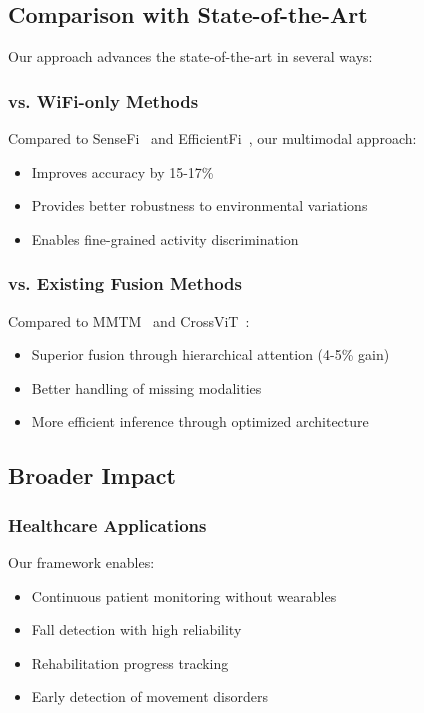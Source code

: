 \documentclass[journal]{IEEEtran}
\begin{document}
\subsection{Comparison with State-of-the-Art}

Our approach advances the state-of-the-art in several ways:

\subsubsection{vs. WiFi-only Methods}

Compared to SenseFi~\cite{sensefi2023} and EfficientFi~\cite{efficientfi2022}, our multimodal approach:
\begin{itemize}
\item Improves accuracy by 15-17\%
\item Provides better robustness to environmental variations
\item Enables fine-grained activity discrimination
\end{itemize}

\subsubsection{vs. Existing Fusion Methods}

Compared to MMTM~\cite{mmtm2023} and CrossViT~\cite{crossvit2024}:
\begin{itemize}
\item Superior fusion through hierarchical attention (4-5\% gain)
\item Better handling of missing modalities
\item More efficient inference through optimized architecture
\end{itemize}

\subsection{Broader Impact}

\subsubsection{Healthcare Applications}

Our framework enables:
\begin{itemize}
\item Continuous patient monitoring without wearables
\item Fall detection with high reliability
\item Rehabilitation progress tracking
\item Early detection of movement disorders
\end{itemize}
\end{document}
